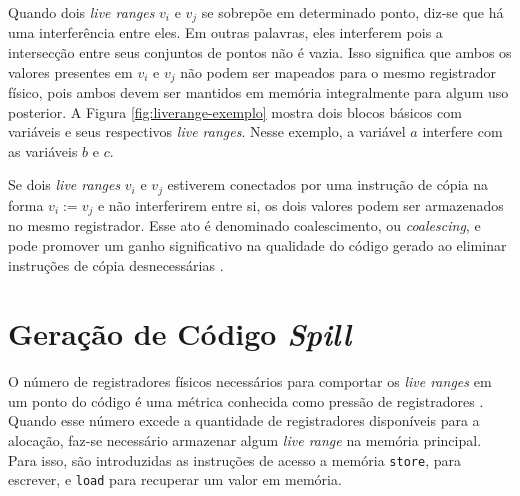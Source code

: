 \documentclass[
	12pt,				%
	openright,			%
	twoside,			%
	a4paper,			%
	tcc,			%
	]{ABNT-DC-UEL}
\begin{document}
Quando dois \textit{live ranges} $v_i$ e $v_j$ se sobrepõe em determinado ponto, diz-se que há uma interferência entre eles. Em outras palavras, eles interferem pois a intersecção entre seus conjuntos de pontos não é vazia. Isso significa que ambos os valores presentes em $v_i$ e $v_j$ não podem ser mapeados para o mesmo registrador físico, pois ambos devem ser mantidos em memória integralmente para algum uso posterior. A Figura \ref{fig:liverange-exemplo} mostra dois blocos básicos com variáveis e seus respectivos \textit{live ranges}. Nesse exemplo, a variável $a$ interfere com as variáveis $b$ e $c$.

Se dois \textit{live ranges} $v_i$ e $v_j$ estiverem conectados por uma instrução de cópia na forma $v_i := v_j$ e não interferirem entre si, os dois valores podem ser armazenados no mesmo registrador. Esse ato é denominado coalescimento, ou \textit{coalescing}, e pode promover um ganho significativo na qualidade do código gerado ao eliminar instruções de cópia desnecessárias \cite{appel:96, chaitin:82, briggs:92}.

\section{Geração de Código \textit{Spill}}

O número de registradores físicos necessários para comportar os \textit{live ranges} em um ponto do código é uma métrica conhecida como pressão de registradores \cite{braun:09}. Quando esse número excede a quantidade de registradores disponíveis para a alocação, faz-se necessário armazenar algum \textit{live range} na memória principal. Para isso, são introduzidas as instruções de acesso a memória \texttt{store}, para escrever, e \texttt{load} para recuperar um valor em memória. 
\end{document}
